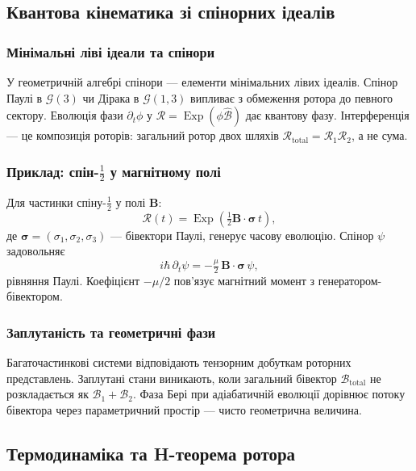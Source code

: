 \documentclass[11pt,a4paper]{article}
\newcommand{\Exp}{\operatorname{Exp}}
\newcommand{\Rotor}{\mathcal{R}}
\newcommand{\Biv}{\mathcal{B}}
\theoremstyle{definition}
\theoremstyle{plain}
\theoremstyle{remark}
\begin{document}
\subsection{Квантова кінематика зі спінорних ідеалів}

\subsubsection{Мінімальні ліві ідеали та спінори}

У геометричній алгебрі спінори — елементи мінімальних лівих ідеалів. Спінор Паулі в $\mathcal{G}(3)$ чи Дірака в $\mathcal{G}(1,3)$ випливає з обмеження ротора до певного сектору. Еволюція фази $\partial_t \phi$ у $\Rotor = \Exp(\phi\hat{\Biv})$ дає квантову фазу. Інтерференція — це композиція роторів: загальний ротор двох шляхів $\Rotor_{\text{total}} = \Rotor_1 \Rotor_2$, а не сума.

\subsubsection{Приклад: спін-$\tfrac{1}{2}$ у магнітному полі}

Для частинки спіну-$\tfrac{1}{2}$ у полі $\mathbf{B}$:
\begin{equation}
\Rotor(t) = \Exp\!\left(\tfrac{1}{2}\mathbf{B}\cdot\bm{\sigma}\, t\right),
\end{equation}
де $\bm{\sigma} = (\sigma_1, \sigma_2, \sigma_3)$ — бівектори Паулі, генерує часову еволюцію. Спінор $\psi$ задовольняє
\begin{equation}
i\hbar\, \partial_t \psi = -\tfrac{\mu}{2}\, \mathbf{B}\cdot\bm{\sigma}\, \psi,
\end{equation}
рівняння Паулі. Коефіцієнт $-\mu/2$ пов’язує магнітний момент з генератором-бівектором.

\subsubsection{Заплутаність та геометричні фази}

Багаточастинкові системи відповідають тензорним добуткам роторних представлень. Заплутані стани виникають, коли загальний бівектор $\Biv_{\text{total}}$ не розкладається як $\Biv_1 + \Biv_2$. Фаза Бері при адіабатичній еволюції дорівнює потоку бівектора через параметричний простір — чисто геометрична величина.

\subsection{Термодинаміка та H-теорема ротора}
\end{document}
